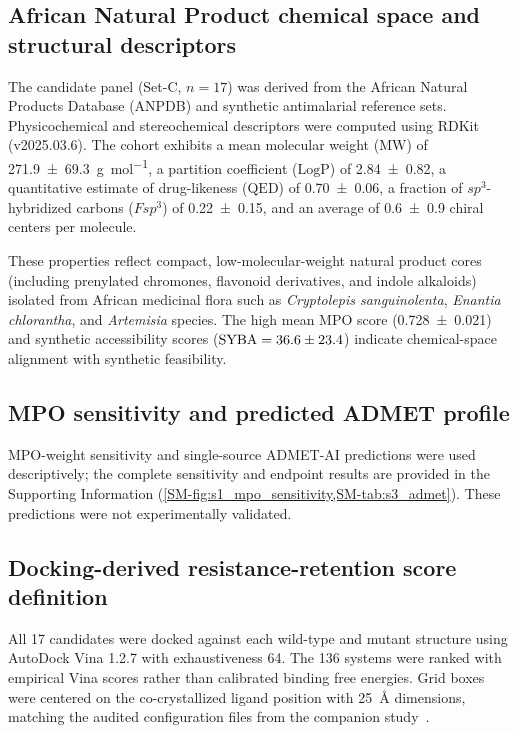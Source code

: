 \documentclass[journal=jcisd8,manuscript=article,layout=traditional]{achemso}
\begin{document}
\subsection{African Natural Product chemical space and structural descriptors}

The candidate panel (Set-C, $n=\num{17}$) was derived from the African Natural Products Database (ANPDB) and synthetic antimalarial reference sets. Physicochemical and stereochemical descriptors were computed using RDKit (v2025.03.6). The cohort exhibits a mean molecular weight ($\mathrm{MW}$) of \qty{271.9 \pm 69.3}{\g\per\mole}, a partition coefficient ($\mathrm{LogP}$) of \num{2.84 \pm 0.82}, a quantitative estimate of drug-likeness ($\mathrm{QED}$) of \num{0.70 \pm 0.06}, a fraction of $sp^3$-hybridized carbons ($Fsp^3$) of \num{0.22 \pm 0.15}, and an average of \num{0.6 \pm 0.9} chiral centers per molecule.

These properties reflect compact, low-molecular-weight natural product cores (including prenylated chromones, flavonoid derivatives, and indole alkaloids) isolated from African medicinal flora such as \textit{Cryptolepis sanguinolenta}, \textit{Enantia chlorantha}, and \textit{Artemisia} species. The high mean MPO score (\num{0.728 \pm 0.021}) and synthetic accessibility scores ($\mathrm{SYBA} = \num{36.6 \pm 23.4}$) indicate chemical-space alignment with synthetic feasibility.

\subsection{MPO sensitivity and predicted ADMET profile}

MPO-weight sensitivity and single-source ADMET-AI predictions were used descriptively; the complete sensitivity and endpoint results are provided in the Supporting Information (\cref{SM-fig:s1_mpo_sensitivity,SM-tab:s3_admet}). These predictions were not experimentally validated.

\subsection{Docking-derived resistance-retention score definition}\label{sec:rrs_formula}

All 17 candidates were docked against each wild-type and mutant structure using AutoDock Vina 1.2.7 with exhaustiveness \num{64}. The 136 systems were ranked with empirical Vina scores rather than calibrated binding free energies. Grid boxes were centered on the co-crystallized ligand position with \qty{25}{\angstrom} dimensions, matching the audited configuration files from the companion study~\citep{Temgoua2026}.
\end{document}
